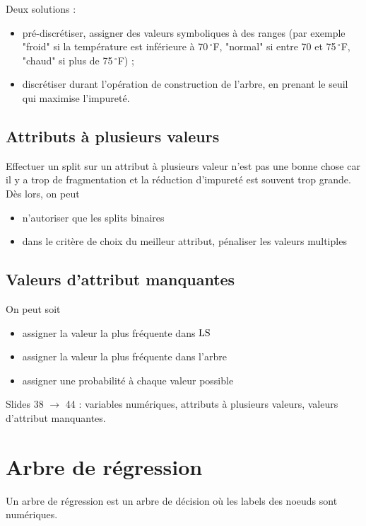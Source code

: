 	Deux solutions :
	\begin{itemize}
		\item pré-discrétiser, assigner des valeurs symboliques à des ranges (par exemple "froid" si la température est inférieure à 70$\,^{\circ}$F, "normal" si entre 70 et 75$\,^{\circ}$F, "chaud" si plus de 75$\,^{\circ}$F) ;
		\item discrétiser durant l'opération de construction de l'arbre, en prenant le seuil qui maximise l'impureté.
	\end{itemize}
	
	\subsection{Attributs à plusieurs valeurs}
	
	Effectuer un split sur un attribut à plusieurs valeur n'est pas une bonne chose car il y a trop de fragmentation et la réduction d'impureté est souvent trop grande. Dès lors, on peut
	
	\begin{itemize}
		\item n'autoriser que les splits binaires
		\item dans le critère de choix du meilleur attribut, pénaliser les valeurs multiples
	\end{itemize}
	
	\subsection{Valeurs d'attribut manquantes}
	
	On peut soit
	\begin{itemize}
		\item assigner la valeur la plus fréquente dans $\text{LS}$
		\item assigner la valeur la plus fréquente dans l'arbre
		\item assigner une probabilité à chaque valeur possible
	\end{itemize}
	

	
	Slides 38 $\rightarrow$ 44 : variables numériques, attributs à plusieurs valeurs, valeurs d'attribut manquantes.
	
\section{Arbre de régression}
	
	Un arbre de régression est un arbre de décision où les labels des noeuds sont numériques.
	

